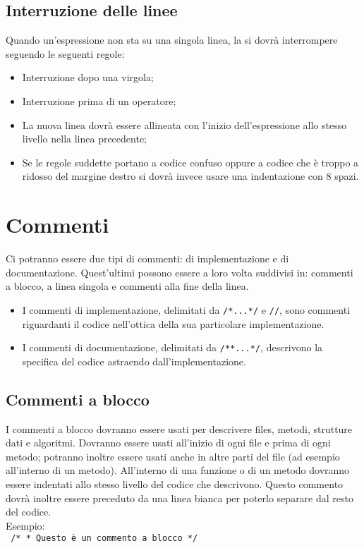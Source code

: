 \subsection{Interruzione delle linee}
Quando un'espressione non sta su una singola linea, la si dovr\`a interrompere seguendo le seguenti regole:
\begin{itemize}
\item Interruzione dopo una virgola;
\item Interruzione prima di un operatore;
\item La nuova linea dovr\`a essere allineata con l'inizio dell'espressione allo stesso livello nella linea precedente;
\item Se le regole suddette portano a codice confuso oppure a codice che è troppo a ridosso del margine destro si dovr\`a invece usare una indentazione con 8 spazi.
\end{itemize}


\section{Commenti}
Ci potranno essere due tipi di commenti: di implementazione e di documentazione. Quest'ultimi possono essere a loro volta suddivisi in: commenti a blocco, a linea singola e commenti alla fine della linea.
\begin{itemize}
\item I commenti di implementazione, delimitati da \texttt{/*...*/} e \texttt{//}, sono commenti riguardanti il codice nell'ottica della sua particolare implementazione.
\item I commenti di documentazione, delimitati da \texttt{/**...*/}, descrivono la specifica del codice astraendo dall'implementazione.
\end{itemize}
\subsection{Commenti a blocco}
I commenti a blocco dovranno essere usati per descrivere files, metodi, strutture dati e algoritmi. Dovranno essere usati all'inizio di ogni file e prima di ogni metodo; potranno inoltre essere usati anche in altre parti del file (ad esempio all'interno di un metodo). All'interno di una funzione o di un metodo dovranno essere indentati allo stesso livello del codice che descrivono. Questo commento dovr\`a inoltre essere preceduto da una linea bianca per poterlo separare dal resto del codice. \\
 \newline
Esempio: \\
\texttt{
	/* \newline
	* Questo è un commento a blocco \newline
	*/
} \\
 \newline
